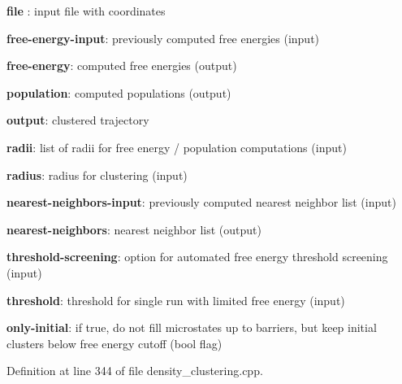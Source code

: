\begin{DoxyItemize}
\item {\bfseries file} \-: input file with coordinates\par

\item {\bfseries free-\/energy-\/input}\-: previously computed free energies (input)\par

\item {\bfseries free-\/energy}\-: computed free energies (output)\par

\item {\bfseries population}\-: computed populations (output)\par

\item {\bfseries output}\-: clustered trajectory\par

\item {\bfseries radii}\-: list of radii for free energy / population computations (input)\par

\item {\bfseries radius}\-: radius for clustering (input)\par

\item {\bfseries nearest-\/neighbors-\/input}\-: previously computed nearest neighbor list (input)\par

\item {\bfseries nearest-\/neighbors}\-: nearest neighbor list (output)\par

\item {\bfseries threshold-\/screening}\-: option for automated free energy threshold screening (input)\par

\item {\bfseries threshold}\-: threshold for single run with limited free energy (input)\par

\item {\bfseries only-\/initial}\-: if true, do not fill microstates up to barriers, but keep initial clusters below free energy cutoff (bool flag) 
\end{DoxyItemize}

Definition at line 344 of file density\-\_\-clustering.\-cpp.

